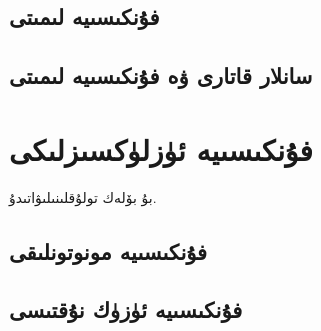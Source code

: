 \subsection{فۇنكىسىيە لىمىتى}
\subsection{سانلار قاتارى ۋە فۇنكىسىيە لىمىتى}

\section{فۇنكىسىيە ئۈزلۈكسىزلىكى}
بۇ بۆلەك تولۇقلىنىلىۋاتىدۇ.
\subsection{فۇنكىسىيە مونوتونلىقى}
\subsection{فۇنكىسىيە ئۈزۈك نۇقتىسى}
